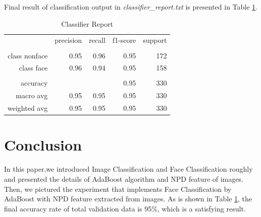 \documentclass[journal, a4paper]{IEEEtran}
\begin{document}
Final result of classification output in \textit{classifier\_report.txt} is presented in Table \ref{tab:report}.
\begin{table}[!hbt]
  \centering
  \caption{Classifier Report}
  \label{tab:report}
  \begin{tabular}{rrrrr}
    \hline
     &precision&recall&f1-score&support\\
     \\
     class nonface&0.95&0.96&0.95&172\\
     class face&0.96&0.94&0.95&158\\
     \\
     accuracy&&&0.95&330\\
     macro avg&0.95&0.95&0.95&330\\
     weighted avg&0.95&0.95&0.95&330\\
    \hline
  \end{tabular}
\end{table}


\section{Conclusion}
In this paper,we introduced Image Classification and Face Classification roughly and presented the details of AdaBoost algorithm and NPD feature of images.
Then, we pictured the experiment that implements Face Classification by AdaBoost with NPD feature extracted from images.
As is shown in Table \ref{tab:report}, the final accuracy rate of total validation data is 95\%, which is a satisfying result.
\end{document}
